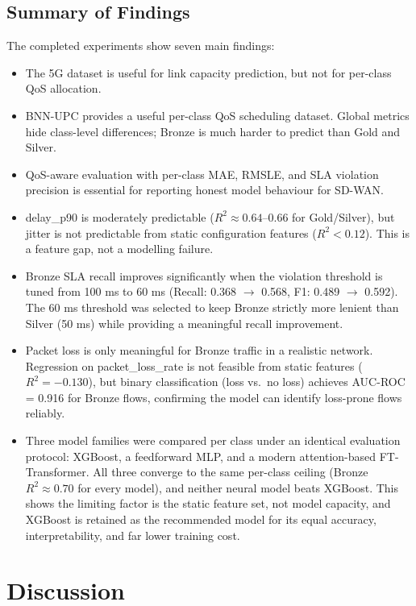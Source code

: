 \documentclass[a4paper,12pt]{Classes/RoboticsLaTeX}
\begin{document}
\section{Summary of Findings}

The completed experiments show seven main findings:

\begin{itemize}
    \item The 5G dataset is useful for link capacity prediction, but not for per-class QoS allocation.
    \item BNN-UPC provides a useful per-class QoS scheduling dataset. Global metrics hide class-level differences; Bronze is much harder to predict than Gold and Silver.
    \item QoS-aware evaluation with per-class MAE, RMSLE, and SLA violation precision is essential for reporting honest model behaviour for SD-WAN.
    \item delay\_p90 is moderately predictable ($R^2 \approx 0.64$--0.66 for Gold/Silver), but jitter is not predictable from static configuration features ($R^2 < 0.12$). This is a feature gap, not a modelling failure.
    \item Bronze SLA recall improves significantly when the violation threshold is tuned from 100 ms to 60 ms (Recall: 0.368 $\rightarrow$ 0.568, F1: 0.489 $\rightarrow$ 0.592). The 60 ms threshold was selected to keep Bronze strictly more lenient than Silver (50 ms) while providing a meaningful recall improvement.
    \item Packet loss is only meaningful for Bronze traffic in a realistic network. Regression on packet\_loss\_rate is not feasible from static features ($R^2 = -0.130$), but binary classification (loss vs.\ no loss) achieves AUC-ROC = 0.916 for Bronze flows, confirming the model can identify loss-prone flows reliably.
    \item Three model families were compared per class under an identical evaluation protocol: XGBoost, a feedforward MLP, and a modern attention-based FT-Transformer. All three converge to the same per-class ceiling (Bronze $R^2 \approx 0.70$ for every model), and neither neural model beats XGBoost. This shows the limiting factor is the static feature set, not model capacity, and XGBoost is retained as the recommended model for its equal accuracy, interpretability, and far lower training cost.
\end{itemize}

\chapter{Discussion}
\label{chap:discussion}
\end{document}
